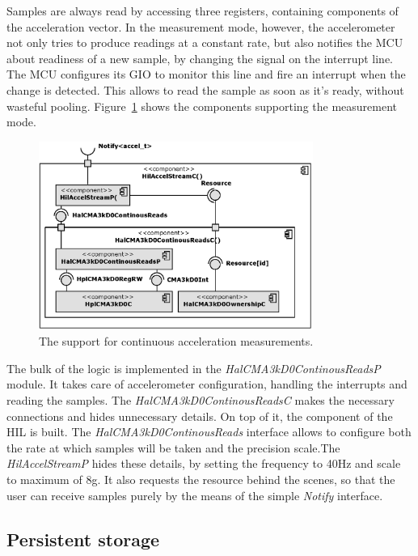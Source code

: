 Samples are always read by accessing three registers, containing components of the acceleration vector. In the measurement mode, however, the accelerometer not only tries to produce readings at a constant rate, but also notifies the MCU about readiness of a new sample, by changing the signal on the interrupt line. The MCU configures its GIO to monitor this line and fire an interrupt when the change is detected. This allows to read the sample as soon as it's ready, without wasteful pooling. Figure~\ref{fig:hil_accel_stream_c} shows the components supporting the measurement mode.
\begin{figure}[h]
  \centering
  \includegraphics[width=0.8\textwidth]{diagrams/hil_accel_stream_c.eps}
  \caption{The support for continuous acceleration measurements.}
  \label{fig:hil_accel_stream_c}
\end{figure}

The bulk of the logic is implemented in the \emph{HalCMA3kD0ContinousReadsP} module. It takes care of accelerometer configuration, handling the interrupts and reading the samples. The \emph{HalCMA3kD0ContinousReadsC} makes the necessary connections and hides unnecessary details. On top of it, the component of the HIL is built. The \emph{HalCMA3kD0ContinousReads} interface allows to configure both the rate at which samples will be taken and the precision scale.The \emph{HilAccelStreamP} hides these details, by setting the frequency to 40Hz and scale to maximum of 8g. It also requests the resource behind the scenes, so that the user can receive samples purely by the means of the simple \emph{Notify} interface.

\subsection{Persistent storage}

